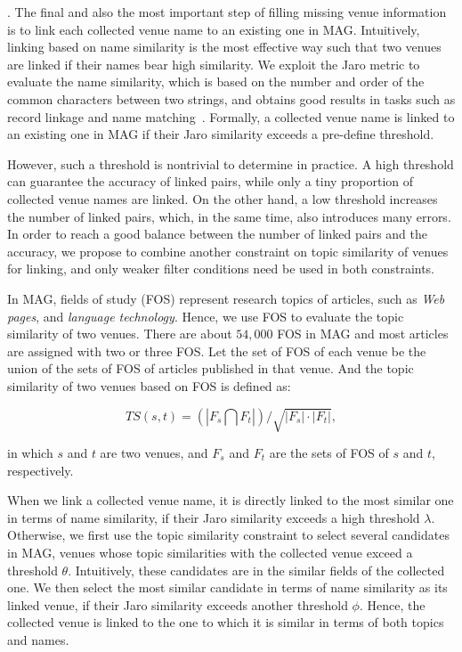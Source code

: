 {%
.
The final and also the most important step of filling missing venue information is to link each collected venue name to an existing one in MAG. Intuitively, linking based on name similarity is the most effective way such that two venues are linked if their names bear high similarity. We exploit the Jaro metric to evaluate the name similarity, which is based on the number and order of the common characters between two strings, and obtains good results in tasks such as record linkage and name matching~\cite{Cohen03strcompa}. Formally, a collected venue name is linked to an existing one in MAG if their Jaro similarity exceeds a pre-define threshold.

However, such a threshold is nontrivial to determine in practice. A high threshold can guarantee the accuracy of linked pairs, while only a tiny proportion of collected venue names are linked. On the other hand, a low threshold increases the number of linked pairs, which, in the same time, also introduces many errors. In order to reach a good balance between the number of linked pairs and the accuracy, we propose to combine another constraint on topic similarity of venues for linking, and only weaker filter conditions need be used in both constraints.

In MAG, fields of study (FOS) represent research topics of articles, such as {\em Web pages}, and {\em language technology}. Hence, we use FOS to evaluate the topic similarity of two venues. There are about $54,000$ FOS in MAG and most articles are assigned with two or three FOS. Let the set of FOS of each venue be the union of the sets of FOS of articles published in that venue. And the topic similarity of two venues based on FOS is defined as:
\begin{small}
\begin{equation} \label{eq-fos}
TS(s,t)=({|F_s\bigcap F_t|})/{\sqrt{|F_s|\cdot|F_t|}},
\end{equation}
\end{small}
\noindent in which $s$ and $t$ are two venues, and $F_s$ and $F_t$ are the sets of FOS of $s$ and $t$, respectively.

When we link a collected venue name, it is directly linked to the most similar one in terms of name similarity, if their Jaro similarity exceeds a high threshold $\lambda$. Otherwise, we first use the topic similarity constraint to select several candidates in MAG, \ie venues whose topic similarities with the collected venue exceed a threshold $\theta$. Intuitively, these candidates are in the similar fields of the collected one. We then select the most similar candidate in terms of name similarity as its linked venue, if their Jaro similarity exceeds another threshold $\phi$. Hence, the collected venue is linked to the one to which it is similar in terms of both topics and names.

}
